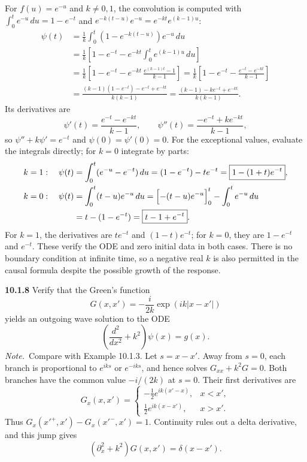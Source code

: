 For $f(u)=e^{-u}$ and $k\ne0,1$, the convolution is computed with
$\int_0^te^{-u}\,du=1-e^{-t}$ and $e^{-k(t-u)}e^{-u}=e^{-kt}e^{(k-1)u}$:
\begin{align*}
\psi(t)&=\frac1k\int_0^t\left(1-e^{-k(t-u)}\right)e^{-u}\,du\\
&=\frac1k\left[1-e^{-t}-e^{-kt}\int_0^t e^{(k-1)u}\,du\right]\\
&=\frac1k\left[1-e^{-t}-e^{-kt}\,\frac{e^{(k-1)t}-1}{k-1}\right]
=\frac1k\left[1-e^{-t}-\frac{e^{-t}-e^{-kt}}{k-1}\right]\\
&=\frac{(k-1)(1-e^{-t})-e^{-t}+e^{-kt}}{k(k-1)}
=\boxed{\frac{(k-1)-ke^{-t}+e^{-kt}}{k(k-1)}}.
\end{align*}
Its derivatives are
\[
\psi'(t)=\frac{e^{-t}-e^{-kt}}{k-1},\qquad
\psi''(t)=\frac{-e^{-t}+ke^{-kt}}{k-1},
\]
so $\psi''+k\psi'=e^{-t}$ and $\psi(0)=\psi'(0)=0$.
For the exceptional values, evaluate the integrals directly; for $k=0$
integrate by parts:
\begin{align*}
k=1:\quad
\psi(t)&=\int_0^t(e^{-u}-e^{-t})\,du=(1-e^{-t})-te^{-t}
=\boxed{1-(1+t)e^{-t}},\\
k=0:\quad
\psi(t)&=\int_0^t(t-u)e^{-u}\,du
=\Bigl[-(t-u)e^{-u}\Bigr]_0^t-\int_0^te^{-u}\,du\\
&=t-(1-e^{-t})=\boxed{t-1+e^{-t}}.
\end{align*}
For $k=1$, the derivatives are $te^{-t}$ and $(1-t)e^{-t}$;
for $k=0$, they are $1-e^{-t}$ and $e^{-t}$. These verify the ODE
and zero initial data in both cases. There is no boundary condition at
infinite time, so a negative real $k$ is also permitted in the causal
formula despite the possible growth of the response.

\par\bigskip
\noindent\textbf{10.1.8}\quad {} Verify that the Green's function
\[
G(x,x')=-\frac{i}{2k}\exp\left(ik|x-x'|\right)
\]
yields an outgoing wave solution to the ODE
\[
\left(\frac{d^{2}}{dx^{2}}+k^{2}\right)\psi(x)=g(x).
\]
\emph{Note.}~Compare with Example 10.1.3.
\solution
{}
Let $s=x-x'$. Away from $s=0$, each branch is proportional to
$e^{iks}$ or $e^{-iks}$, and hence solves $G_{xx}+k^2G=0$.
Both branches have the common value $-i/(2k)$ at $s=0$. Their first
derivatives are
\[
G_x(x,x')=\begin{cases}
-\frac12e^{ik(x'-x)},&x<x',\\
\frac12e^{ik(x-x')},&x>x'.
\end{cases}
\]
Thus $G_x(x'^+,x')-G_x(x'^-,x')=1$. Continuity rules out a delta
derivative, and this jump gives
\[
(\partial_x^2+k^2)G(x,x')=\delta(x-x').
\]

